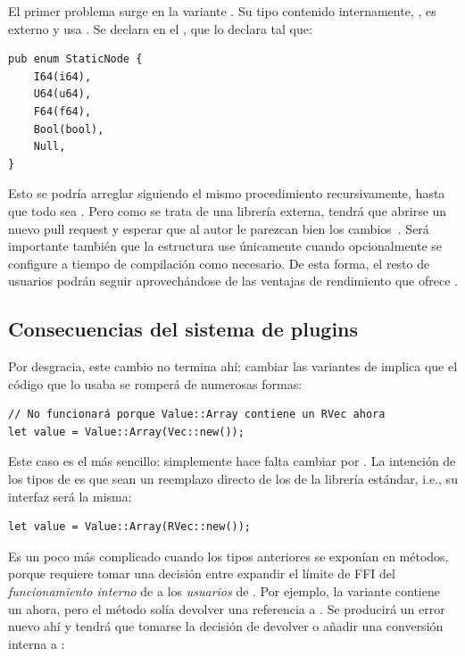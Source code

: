 El primer problema surge en la variante . Su tipo contenido
internamente, , es externo y usa . Se
declara en el \crate {}, que lo declara tal que:

\begin{verbatim}
pub enum StaticNode {
    I64(i64),
    U64(u64),
    F64(f64),
    Bool(bool),
    Null,
}
\end{verbatim}

Esto se podría arreglar siguiendo el mismo procedimiento recursivamente, hasta
que todo sea \code{#[repr(C)]}. Pero como se trata de una librería externa,
tendrá que abrirse un nuevo pull request y esperar que al autor le parezcan bien
los cambios~\cite{openstaticnode}. Será importante también que la estructura use
\code{#[repr(C)]} únicamente cuando opcionalmente se configure a tiempo de
compilación como necesario. De esta forma, el resto de usuarios podrán seguir
aprovechándose de las ventajas de rendimiento que ofrece .

\subsection{Consecuencias del sistema de plugins}

Por desgracia, este cambio no termina ahí; cambiar las variantes de 
implica que el código que lo usaba se romperá de numerosas formas:

\begin{verbatim}
// No funcionará porque Value::Array contiene un RVec ahora
let value = Value::Array(Vec::new());
\end{verbatim}

Este caso es el más sencillo: simplemente hace falta cambiar  por
. La intención de los tipos de \abistable es que sean un reemplazo
directo de los de la librería estándar, i.e., su interfaz será la misma:

\begin{verbatim}
let value = Value::Array(RVec::new());
\end{verbatim}

Es un poco más complicado cuando los tipos anteriores se exponían en métodos,
porque requiere tomar una decisión entre expandir el límite de FFI del
\emph{funcionamiento interno} de  a los \emph{usuarios} de
. Por ejemplo, la variante  contiene un
 ahora, pero el método  solía devolver una
referencia a . Se producirá un error nuevo ahí y tendrá que
tomarse la decisión de devolver  o añadir una conversión interna
a :

